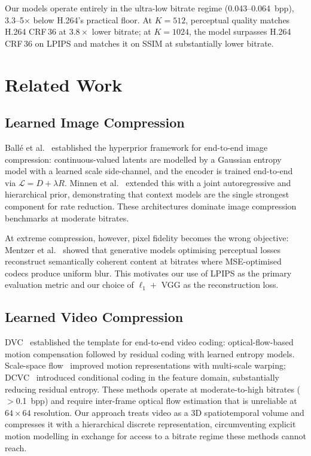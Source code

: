 \documentclass[sigconf, screen, review, anonymous]{acmart}
\begin{document}
Our models operate entirely in the ultra-low bitrate regime
(0.043--0.064~bpp), 3.3--5$\times$ below H.264's practical floor. At
$K{=}512$, perceptual quality matches H.264 CRF\,36 at $3.8\times$
lower bitrate; at $K{=}1024$, the model surpasses H.264 CRF\,36 on
LPIPS and matches it on SSIM at substantially lower bitrate.

\section{Related Work}
\label{sec:related}

\subsection{Learned Image Compression}
Ball\'e et al.~\cite{balle2018hyperprior} established the hyperprior
framework for end-to-end image compression: continuous-valued latents
are modelled by a Gaussian entropy model with a learned scale
side-channel, and the encoder is trained end-to-end via
$\mathcal{L} = D + \lambda R$. Minnen et al.~\cite{minnen2018joint}
extended this with a joint autoregressive and hierarchical prior,
demonstrating that context models are the single strongest component
for rate reduction. These architectures dominate image compression
benchmarks at moderate bitrates.

At extreme compression, however, pixel fidelity becomes the wrong
objective: Mentzer et al.~\cite{mentzer2020hific} showed that
generative models optimising perceptual losses reconstruct semantically
coherent content at bitrates where MSE-optimised codecs produce uniform
blur. This motivates our use of LPIPS as the primary evaluation metric
and our choice of $\ell_1 +$ VGG as the reconstruction loss.

\subsection{Learned Video Compression}
DVC~\cite{lu2019dvc} established the template for end-to-end video
coding: optical-flow-based motion compensation followed by residual
coding with learned entropy models. Scale-space flow~\cite{agustsson2020scalespcflow}
improved motion representations with multi-scale warping; DCVC~\cite{li2021dcvc}
introduced conditional coding in the feature domain, substantially
reducing residual entropy. These methods operate at moderate-to-high
bitrates ($>$0.1~bpp) and require inter-frame optical flow estimation
that is unreliable at $64\!\times\!64$ resolution. Our approach treats
video as a 3D spatiotemporal volume and compresses it with a
hierarchical discrete representation, circumventing explicit motion
modelling in exchange for access to a bitrate regime these methods
cannot reach.
\end{document}
